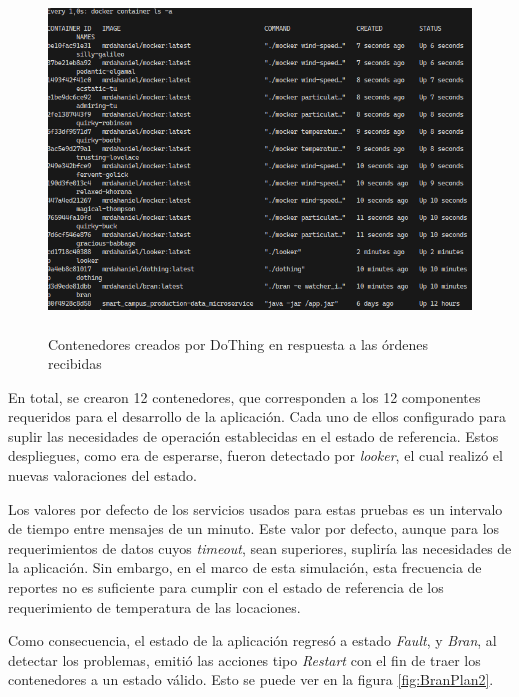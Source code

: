 \begin{figure}[ht]
    \centering
    \caption{\\Contenedores creados por DoThing en respuesta a las órdenes recibidas}
    \label{fig:ContainerState}
    \includegraphics[width=0.9\linewidth]{images/ContainerLaunching.png}
    \vspace{-4mm}
\end{figure}

En total, se crearon 12 contenedores, que corresponden a los 12 componentes requeridos para el desarrollo de la aplicación. Cada uno de ellos configurado para suplir las necesidades de operación establecidas en el estado de referencia. Estos despliegues, como era de esperarse, fueron detectado por \textit{looker}, el cual realizó el nuevas valoraciones del estado. 

Los valores por defecto de los servicios usados para estas pruebas es un intervalo de tiempo entre mensajes de un minuto. Este valor por defecto, aunque para los requerimientos de datos cuyos \textit{timeout}, sean superiores, supliría las necesidades de la aplicación. Sin embargo, en el marco de esta simulación, esta frecuencia de reportes no es suficiente para cumplir con el estado de referencia de los requerimiento de temperatura de las locaciones.

Como consecuencia, el estado de la aplicación regresó a estado \textit{Fault}, y \textit{Bran}, al detectar los problemas, emitió las acciones tipo \textit{Restart} con el fin de traer los contenedores a un estado válido. Esto se puede ver en la figura \ref{fig:BranPlan2}.

